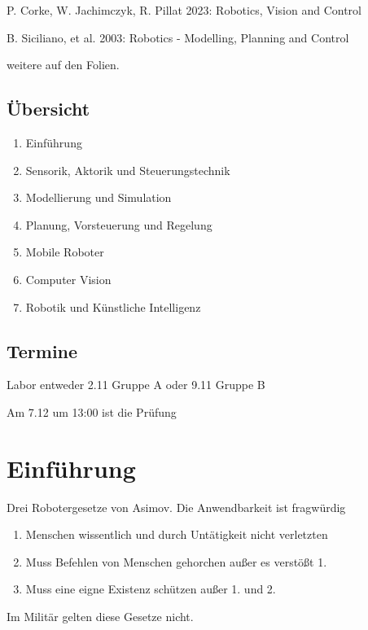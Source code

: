 \documentclass[a4paper]{article}
\begin{document}
P. Corke, W. Jachimczyk, R. Pillat 2023: Robotics, Vision and Control

B. Siciliano, et al. 2003: Robotics - Modelling, Planning and Control

weitere auf den Folien.

\subsection{Übersicht}

\begin{enumerate}
    \item Einführung
    \item Sensorik, Aktorik und Steuerungstechnik
    \item Modellierung und Simulation
    \item Planung, Vorsteuerung und Regelung
    \item Mobile Roboter
    \item Computer Vision
    \item Robotik und Künstliche Intelligenz
\end{enumerate}

\subsection{Termine}

Labor entweder 2.11 Gruppe A oder 9.11 Gruppe B

Am 7.12 um 13:00 ist die Prüfung

\section{Einführung}

Drei Robotergesetze von Asimov. Die Anwendbarkeit ist fragwürdig

\begin{enumerate}
    \item Menschen wissentlich und durch Untätigkeit nicht verletzten
    \item Muss Befehlen von Menschen gehorchen außer es verstößt 1.
    \item Muss eine eigne Existenz schützen außer 1. und 2.
\end{enumerate}

Im Militär gelten diese Gesetze nicht.

\end{document}
